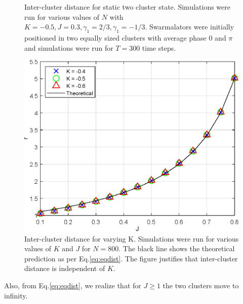 \documentclass[twocolumn,10pt]{asme2ej}
\begin{document}
{{\begin{figure}[h!]
            \caption{Inter-cluster distance for static two cluster state. Simulations were run for various values of \(N\) with \(K = -0.5,J = 0.3,\gamma_1 = 2/3,\gamma_1 = -1/3\). Swarmalators were initially positioned in two equally sized clusters with average phase \(0\) and \(\pi\) and simulations were run for \(T = 300\) time steps.}
            \label{fig:dvn}
        \end{figure}
        \begin{figure}[h!]
            \includegraphics[width = \linewidth]{interClusterNotLog.eps}
            \caption{Inter-cluster distance for varying K. Simulations were run for various values of \(K\) and \(J\) for \(N = 800\). The black line shows the theoretical prediction as per Eq.\ref{eq:eqdist}. The figure justifies that inter-cluster distance is independent of \(K\).}
            \label{fig:KvJ}
        \end{figure}
        Also, from Eq.\ref*{eq:eqdist}, we realize that for \(J \geq 1\) the two clusters move to infinity. 
    }
}
\end{document}
